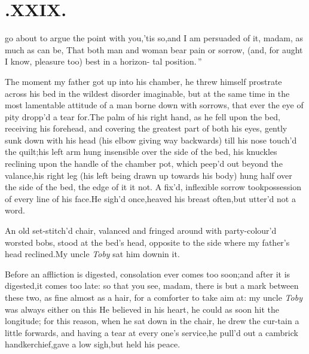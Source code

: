\documentclass{article}
\begin{document}
\section{.\quad  XXIX.}

 go about to argue the\break
point with you,\tsk ’tis so,\tsk and
I am persuaded of it, madam, as much\break
as can be, \lqq That both man and woman\break
\lqq bear pain or sorrow, (and, for aught I\break
\lqq know, pleasure too) best in a horizon-\break
\lqq tal position.\,”

The moment my father got up into his chamber, he threw himself prostrate across his
bed in the wildest disorder ima\-ginable, but at the same time in the
most lamentable attitude of a man borne down with sorrows, that
ever the eye of pity dropp’d a tear for.\tsh The
palm of his right hand, as he fell upon the bed, receiving his
forehead, and covering the greatest part of both his eyes, gently
sunk down with his head (his elbow giving way backwards) till his
nose touch’d the quilt;\tsh his left arm hung
insensible over the side of the bed, his knuckles reclining upon
the handle of the chamber
pot, which peep’d out beyond the va\-lance,\tsh his right leg (his
left being drawn up towards his body) hung half over the side of
the bed, the edge of it 
it not. A fix’d, inflexible sorrow took\break possession of every line
of his face.\tsk He sigh’d once,\tsh heaved his breast
often,\tsk\break but utter’d not a word.

An old set-stitch’d chair, valanced and fringed around
with party-colour’d wor\-sted bobs, stood at the bed’s
head, opposite to the side where my father’s head
reclined.\tsk My uncle \textit{Toby} sat him down\break in it.

Before an affliction is digested,\tsh\break
consolation ever comes too soon;\tsk and 
after it is digested,\tsk it comes too late:
so that you see, madam, there is but a
mark between these two, as fine almost as a hair, for a
comforter to take aim at: my uncle \textit{Toby} was always
either on this
\break
He believed in his heart, he could as soon hit the longitude;
for this reason, when he sat down in the chair, he drew the
cur-tain a little forwards, and having a tear at every one’s
service,\tsk he pull’d out a cambrick handkerchief,\tsh gave a
low sigh,\tsh but held his peace.
\end{document}
